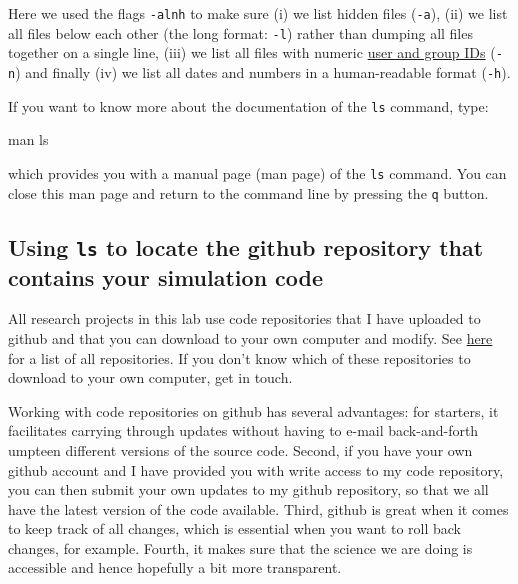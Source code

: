 \documentclass[
]{book}
\newenvironment{Shaded}{\begin{snugshade}}{\end{snugshade}}
\newcommand{\FunctionTok}[1]{\textcolor[rgb]{0.00,0.00,0.00}{#1}}
\newcommand{\NormalTok}[1]{#1}
\begin{document}
Here we used the flags \texttt{-alnh} to make sure (i) we list hidden files (\texttt{-a}), (ii) we list all files below each other (the long format: \texttt{-l}) rather than dumping all files together on a single line, (iii) we list all files with numeric \href{https://en.wikipedia.org/wiki/User_identifier}{user and group IDs} (\texttt{-n}) and finally (iv) we list all dates and numbers in a human-readable format (\texttt{-h}).

If you want to know more about the documentation of the \texttt{ls} command, type:

\begin{Shaded}
\begin{Highlighting}[]
\FunctionTok{man}\NormalTok{ ls}
\end{Highlighting}
\end{Shaded}

which provides you with a manual page (man page) of the \texttt{ls} command. You can close this man page and return to the command line by pressing the \texttt{q} button.

\hypertarget{using-ls-to-locate-the-github-repository-that-contains-your-simulation-code}{%
\subsection{\texorpdfstring{Using \texttt{ls} to locate the github repository that contains your simulation code}{Using ls to locate the github repository that contains your simulation code}}\label{using-ls-to-locate-the-github-repository-that-contains-your-simulation-code}}

All research projects in this lab use code repositories that I have uploaded to github and that you can download to your own computer and modify. See \href{https://github.com/bramkuijper}{here} for a list of all repositories. If you don't know which of these repositories to download to your own computer, get in touch.

Working with code repositories on github has several advantages: for starters, it facilitates carrying through updates without having to e-mail back-and-forth umpteen different versions of the source code. Second, if you have your own github account and I have provided you with write access to my code repository, you can then submit your own updates to my github repository, so that we all have the latest version of the code available. Third, github is great when it comes to keep track of all changes, which is essential when you want to roll back changes, for example. Fourth, it makes sure that the science we are doing is accessible and hence hopefully a bit more transparent.
\end{document}

